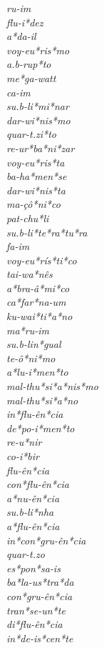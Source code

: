 \begin{multicols}{5}
\setlength{\columnsep}{0pt}
\setlength{\parindent}{0pt}
\emph{ru-im \\ flu-i*dez \\ a*da-il \\ voy-eu*ris*mo \\ a.b-rup*to \\ me*ga-watt \\ ca-im \\ su.b-li*mi*nar \\ dar-wi*nis*mo \\ quar-t.zi*to \\ re-ur*ba*ni*zar \\ voy-eu*ris*ta \\ ba-ha*men*se \\ dar-wi*nis*ta \\ ma-çô*ni*co \\ pat-chu*li \\ su.b-li*te*ra*tu*ra \\ fa-im \\ voy-eu*rís*ti*co \\ tai-wa*nês \\ a*bra-â*mi*co \\ ca*far*na-um \\ ku-wai*ti*a*no \\ ma*ru-im \\ su.b-lin*gual \\ te-ô*ni*mo \\ a*lu-i*men*to \\ mal-thu*si*a*nis*mo \\ mal-thu*si*a*no \\ in*flu-ên*cia \\ de*po-i*men*to \\ re-u*nir \\ co-i*bir \\ flu-ên*cia \\ con*flu-ên*cia \\ a*nu-ên*cia \\ su.b-li*nha \\ a*flu-ên*cia \\ in*con*gru-ên*cia \\ quar-t.zo \\ es*pon*sa-is \\ ba*la-us*tra*da \\ con*gru-ên*cia \\ tran*se-un*te \\ di*flu-ên*cia \\ in*de-is*cen*te}
\end{multicols}
